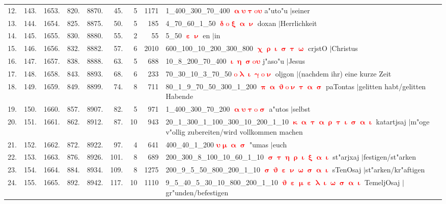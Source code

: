 \documentclass[a4paper,10pt,landscape]{article}
\begin{document}
\begin{tabular}{rrrrrrrrp{120mm}}
12.&143.&1653.&820.&8870.&45.&5&1171&1\_400\_300\_70\_400 \textcolor{red}{$\boldsymbol{\upalpha\upsilon\uptau\mathrm{o}\upsilon}$} a"uto"u $|$seiner\\
13.&144.&1654.&825.&8875.&50.&5&185&4\_70\_60\_1\_50 \textcolor{red}{$\boldsymbol{\updelta\mathrm{o}\upxi\upalpha\upnu}$} doxan $|$Herrlichkeit\\
14.&145.&1655.&830.&8880.&55.&2&55&5\_50 \textcolor{red}{$\boldsymbol{\upepsilon\upnu}$} en $|$in\\
15.&146.&1656.&832.&8882.&57.&6&2010&600\_100\_10\_200\_300\_800 \textcolor{red}{$\boldsymbol{\upchi\uprho\upiota\upsigma\uptau\upomega}$} crjstO $|$Christus\\
16.&147.&1657.&838.&8888.&63.&5&688&10\_8\_200\_70\_400 \textcolor{red}{$\boldsymbol{\upiota\upeta\upsigma\mathrm{o}\upsilon}$} j"aso"u $|$Jesus\\
17.&148.&1658.&843.&8893.&68.&6&233&70\_30\_10\_3\_70\_50 \textcolor{red}{$\boldsymbol{\mathrm{o}\uplambda\upiota\upgamma\mathrm{o}\upnu}$} oljgon $|$(nachdem ihr) eine kurze Zeit\\
18.&149.&1659.&849.&8899.&74.&8&711&80\_1\_9\_70\_50\_300\_1\_200 \textcolor{red}{$\boldsymbol{\uppi\upalpha\upvartheta\mathrm{o}\upnu\uptau\upalpha\upsigma}$} paTontas $|$gelitten habt/gelitten Habende\\
19.&150.&1660.&857.&8907.&82.&5&971&1\_400\_300\_70\_200 \textcolor{red}{$\boldsymbol{\upalpha\upsilon\uptau\mathrm{o}\upsigma}$} a"utos $|$selbst\\
20.&151.&1661.&862.&8912.&87.&10&943&20\_1\_300\_1\_100\_300\_10\_200\_1\_10 \textcolor{red}{$\boldsymbol{\upkappa\upalpha\uptau\upalpha\uprho\uptau\upiota\upsigma\upalpha\upiota}$} katartjsaj $|$m"oge v"ollig zubereiten/wird vollkommen machen\\
21.&152.&1662.&872.&8922.&97.&4&641&400\_40\_1\_200 \textcolor{red}{$\boldsymbol{\upsilon\upmu\upalpha\upsigma}$} "umas $|$euch\\
22.&153.&1663.&876.&8926.&101.&8&689&200\_300\_8\_100\_10\_60\_1\_10 \textcolor{red}{$\boldsymbol{\upsigma\uptau\upeta\uprho\upiota\upxi\upalpha\upiota}$} st"arjxaj $|$festigen/st"arken\\
23.&154.&1664.&884.&8934.&109.&8&1275&200\_9\_5\_50\_800\_200\_1\_10 \textcolor{red}{$\boldsymbol{\upsigma\upvartheta\upepsilon\upnu\upomega\upsigma\upalpha\upiota}$} sTenOsaj $|$st"arken/kr"aftigen\\
24.&155.&1665.&892.&8942.&117.&10&1110&9\_5\_40\_5\_30\_10\_800\_200\_1\_10 \textcolor{red}{$\boldsymbol{\upvartheta\upepsilon\upmu\upepsilon\uplambda\upiota\upomega\upsigma\upalpha\upiota}$} TemeljOsaj $|$gr"unden/befestigen\\
\end{tabular}\medskip \\
\end{document}
